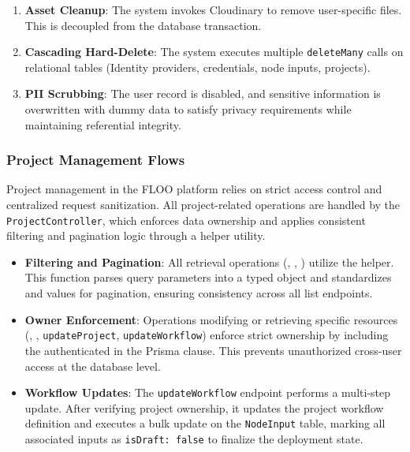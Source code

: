 \begin{enumerate}
    \item \textbf{Asset Cleanup}: The system invokes Cloudinary to remove user-specific files. This is decoupled from the database transaction.
    \item \textbf{Cascading Hard-Delete}: The system executes multiple \texttt{deleteMany} calls on relational tables (Identity providers, credentials, node inputs, projects).
    \item \textbf{PII Scrubbing}: The user record is disabled, and sensitive information is overwritten with dummy data to satisfy privacy requirements while maintaining referential integrity.
\end{enumerate}

\subsubsection{Project Management Flows}

Project management in the FLOO platform relies on strict access control and centralized request sanitization. All project-related operations are handled by the \texttt{ProjectController}, which enforces data ownership and applies consistent filtering and pagination logic through a helper utility.

\begin{itemize}
    \item \textbf{Filtering and Pagination}: All retrieval operations (\texttt{}, \texttt{}, \texttt{}) utilize the \texttt{} helper. This function parses query parameters into a typed \texttt{} object and standardizes \texttt{} and \texttt{} values for pagination, ensuring consistency across all list endpoints.
    \item \textbf{Owner Enforcement}: Operations modifying or retrieving specific resources (\texttt{}, \texttt{}, \texttt{updateProject}, \texttt{updateWorkflow}) enforce strict ownership by including the authenticated \texttt{} in the Prisma \texttt{} clause. This prevents unauthorized cross-user access at the database level.
    \item \textbf{Workflow Updates}: The \texttt{updateWorkflow} endpoint performs a multi-step update. After verifying project ownership, it updates the project workflow definition and executes a bulk update on the \texttt{NodeInput} table, marking all associated inputs as \texttt{isDraft: false} to finalize the deployment state.
\end{itemize}
